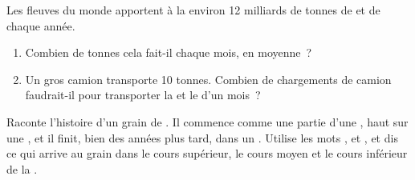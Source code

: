 \begin{exercise}[$\star\star$]\label{exo:g5:water-shapes-the-land:10}
Les fleuves du monde apportent à la  environ 12 milliards de tonnes de
 et de  chaque année.
\begin{enumerate}
  \item[(a)] Combien de tonnes cela fait-il chaque mois, en moyenne~?
  \item[(b)] Un gros camion transporte 10 tonnes. Combien de chargements
        de camion faudrait-il pour transporter la  et le  d'un mois~?
\end{enumerate}
\end{exercise}

\begin{exercise}[$\star\star\star$]\label{exo:g5:water-shapes-the-land:11}
Raconte l'histoire d'un grain de . Il commence comme une partie d'une
, haut sur une , et il finit, bien des années plus tard, dans
un . Utilise les mots \emph{}, \emph{} et
\emph{}, et dis ce qui arrive au grain dans le cours supérieur, le
cours moyen et le cours inférieur de la .
\end{exercise}
